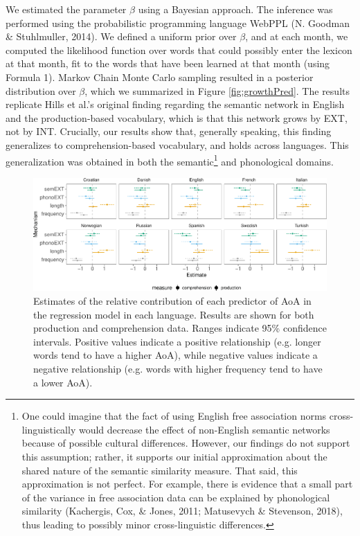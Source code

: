 \documentclass[english,floatsintext,man]{apa6}
\theoremstyle{definition}
\theoremstyle{definition}
\theoremstyle{definition}
\theoremstyle{remark}
\begin{document}
We estimated the parameter \(\beta\) using a Bayesian approach. The
inference was performed using the probabilistic programming language
WebPPL (N. Goodman \& Stuhlmuller, 2014). We defined a uniform prior
over \(\beta\), and at each month, we computed the likelihood function
over words that could possibly enter the lexicon at that month, fit to
the words that have been learned at that month (using Formula 1). Markov
Chain Monte Carlo sampling resulted in a posterior distribution over
\(\beta\), which we summarized in Figure \ref{fig:growthPred}. The
results replicate Hills et al.'s original finding regarding the semantic
network in English and the production-based vocabulary, which is that
this network grows by EXT, not by INT. Crucially, our results show that,
generally speaking, this finding generalizes to comprehension-based
vocabulary, and holds across languages. This generalization was obtained
in both the semantic\footnote{One could imagine that the fact of using
  English free association norms cross-linguistically would decrease the
  effect of non-English semantic networks because of possible cultural
  differences. However, our findings do not support this assumption;
  rather, it supports our initial approximation about the shared nature
  of the semantic similarity measure. That said, this approximation is
  not perfect. For example, there is evidence that a small part of the
  variance in free association data can be explained by phonological
  similarity (Kachergis, Cox, \& Jones, 2011; Matusevych \& Stevenson,
  2018), thus leading to possibly minor cross-linguistic differences.}
and phonological domains.

\begin{figure}[!h]
\includegraphics[width=\textwidth]{ms_files/figure-latex/staticPred-1} \caption{Estimates of the relative contribution of each predictor of AoA in the regression model in each language. Results are shown for both production and comprehension data. Ranges indicate 95\% confidence intervals. Positive values indicate a positive relationship (e.g. longer words tend to have a higher AoA), while negative values indicate a negative relationship (e.g. words with higher frequency tend to have a lower AoA).}\label{fig:staticPred}
\end{figure}
\end{document}
